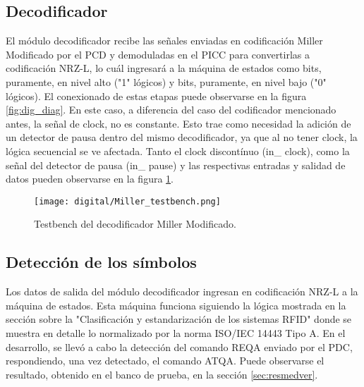 \subsection{Decodificador}

El módulo decodificador recibe las señales enviadas en codificación Miller Modificado por el PCD y demoduladas en el PICC para convertirlas a codificación NRZ-L, lo cuál ingresará a la máquina de estados como bits, puramente, en nivel alto ("1" lógicos) y bits, puramente, en nivel bajo ("0" lógicos). El conexionado de estas etapas puede observarse en la figura \ref{fig:dig_diag}.
En este caso, a diferencia del caso del codificador mencionado antes, la señal de clock, no es constante. Esto trae como necesidad la adición de un detector de pausa dentro del mismo decodificador, ya que al no tener clock, la lógica secuencial se ve afectada. Tanto el clock discontínuo (in\_ clock), como la señal del detector de pausa (in\_ pause) y las respectivas entradas y salidad de datos pueden observarse en la figura \ref{fig:mill_test}.

\begin{figure}[H]
\centering
\texttt{[image: digital/Miller\_testbench.png]}
\caption{Testbench del decodificador Miller Modificado.}
\label{fig:mill_test}
\end{figure}

\subsection{Detección de los símbolos}
Los datos de salida del módulo decodificador ingresan en codificación NRZ-L a la máquina de estados. Esta máquina funciona siguiendo la lógica mostrada en la sección sobre la "Clasificación y estandarización de los sistemas RFID" donde se muestra en detalle lo normalizado por la norma ISO/IEC 14443 Tipo A.
En el desarrollo, se llevó a cabo la detección del comando REQA enviado por el PDC, respondiendo, una vez detectado, el comando ATQA. Puede observarse el resultado, obtenido en el banco de prueba, en la sección \ref{sec:resmedver}.
